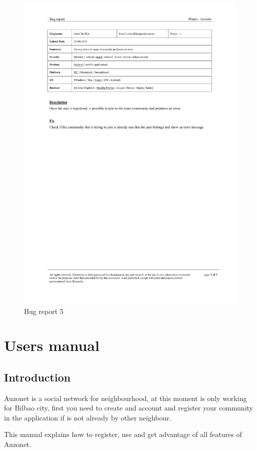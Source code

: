 \documentclass{DeustoFDP}
\begin{document}
\begin{figure}[h!]
	\centering
	\includegraphics[width=1\linewidth]{fig/Bugs/b5}
	\caption[Bug report]{Bug report 5}
	\label{fig:b5}
\end{figure}
\chapter{Users manual}\label{usersmanual}
\section{Introduction}
Auzonet is a social network for neighbourhood, at this moment is only working for Bilbao city, first you need to create and account and register your community in the application if is not already by other neighbour.

This manual explains how to register, use and get advantage of all features of Auzonet.
\end{document}
